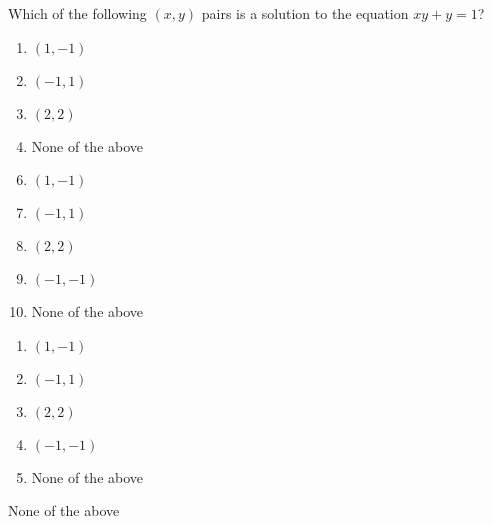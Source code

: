 


 Which of the following $(x,y)$ pairs is a solution to the equation $xy+y=1$?


\ifsat
	\begin{enumerate}[label=\Alph*)]
		\item   $(1,-1)$
		\item $(-1,1)$
		\item   $(2,2)$
		\item  None of the above%
	\end{enumerate}
\else
\fi

\ifacteven
	\begin{enumerate}[label=\textbf{\Alph*.},itemsep=\fill,align=left]
		\setcounter{enumii}{5}
		\item   $(1,-1)$
		\item $(-1,1)$
		\item   $(2,2)$
		\addtocounter{enumii}{1}
		\item  $(-1,-1)$  
		\item  None of the above%
	\end{enumerate}
\else
\fi

\ifactodd
	\begin{enumerate}[label=\textbf{\Alph*.},itemsep=\fill,align=left]
		\item   $(1,-1)$
		\item $(-1,1)$
		\item   $(2,2)$
		\item  $(-1,-1)$  
		\item  None of the above%
	\end{enumerate}
\else
\fi

\ifgridin
  None of the above%

\else
\fi


